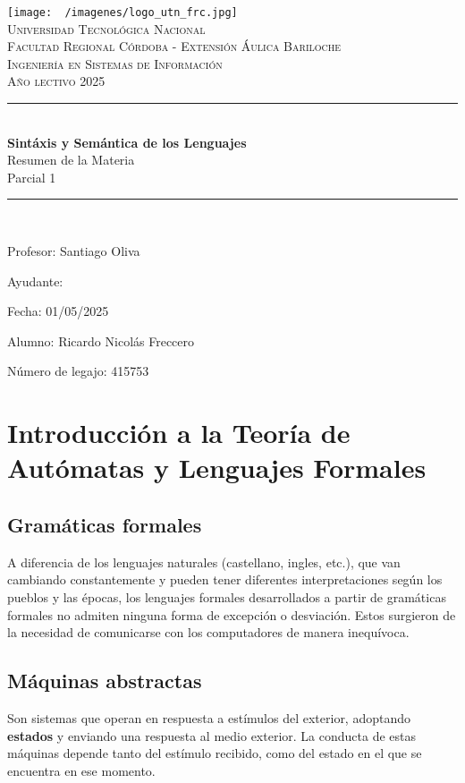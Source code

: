 \documentclass[12pt]{article}
\begin{document}
\begin{titlepage}
	\centering
	\texttt{[image: ~/imagenes/logo\_utn\_frc.jpg]}\\

	\textsc{
		\LARGE Universidad Tecnológica Nacional\\
		\Large Facultad Regional Córdoba - Extensión Áulica Bariloche\\
		\large Ingeniería en Sistemas de Información\\
		Año lectivo 2025\\[0.5cm]
	}

	\rule{\linewidth}{1.0mm}\\[0.4cm]
	\Huge
	\textbf{Sintáxis y Semántica de los Lenguajes}\\
	Resumen de la Materia\\[0.2cm]
	\LARGE
	Parcial 1
	\rule{\linewidth}{1.0mm}\\
	\large
	\begin{flushleft}
		Profesor: Santiago Oliva

		Ayudante:

		Fecha: 01/05/2025
	\end{flushleft}

	\vfill
	\begin{flushright}
		Alumno: Ricardo Nicolás Freccero

		Número de legajo: 415753
	\end{flushright}
\end{titlepage}

\restoregeometry
\tableofcontents
\newpage

\section{Introducción a la Teoría de Autómatas y Lenguajes Formales}
\subsection{Gramáticas formales}
A diferencia de los lenguajes naturales (castellano, ingles, etc.), que van cambiando constantemente y pueden tener diferentes interpretaciones según los pueblos y las épocas, los lenguajes formales desarrollados a partir de gramáticas formales no admiten ninguna forma de excepción o desviación. Estos surgieron de la necesidad de comunicarse con los computadores de manera inequívoca.

\subsection{Máquinas abstractas}
Son sistemas que operan en respuesta a estímulos del exterior, adoptando \textbf{estados} y enviando una respuesta al medio exterior. La conducta de estas máquinas depende tanto del estímulo recibido, como del estado en el que se encuentra en ese momento.
\end{document}

